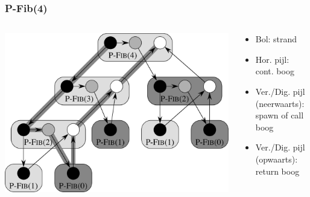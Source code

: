 \documentclass
   [kulak] %
   {kulakbeamer}
\begin{document}
\begin{frame}
\frametitle{P-Fib(4)}


	\begin{columns}[T]
		\begin{column}{.7\textwidth}
		\includegraphics[height=0.7\textheight]{fig2.jpg}			
		\end{column}
	\begin{column}{.25\textwidth}
		\begin{minipage}[c][.6\textheight][c]{\linewidth}
			
			\begin{itemize}
				\item Bol: strand
				\item Hor. pijl: cont. boog
				\item Ver./Dig. pijl (neerwaarts): spawn of call boog
				\item Ver./Dig. pijl (opwaarts): return boog
				
			\end{itemize}
			
		\end{minipage}
	\end{column}
	\end{columns}
	
\end{frame}
\end{document}
